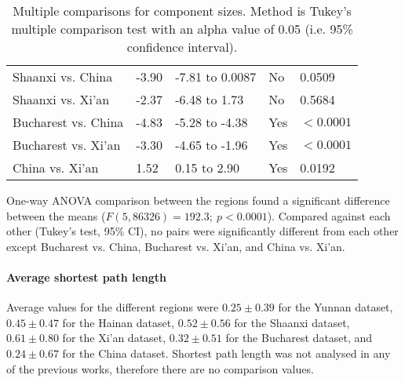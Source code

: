 \begin{table}[h]
\begin{mdframed}
\begin{tabular*}{\linewidth}{l|llll}
			Shaanxi vs. China & -3.90 & -7.81 to 0.0087 & No & 0.0509\\
			Shaanxi vs. Xi'an & -2.37 & -6.48 to 1.73 & No & 0.5684\\
			Bucharest vs. China & -4.83 & -5.28 to -4.38 & Yes & $<0.0001$\\
			Bucharest vs. Xi'an & -3.30 & -4.65 to -1.96 & Yes & $<0.0001$\\
			China vs. Xi'an & 1.52 & 0.15 to 2.90 & Yes & 0.0192\\
			\hline
		\end{tabular*}
		\caption{Multiple comparisons for component sizes. Method is Tukey's multiple comparison test with an alpha value of 0.05 (i.e. 95\% confidence interval).}
		\label{tab:component_size_tukey}
	\end{mdframed}
\end{table}

One-way ANOVA comparison between the regions found a significant difference between the means ($F(5,86326) = 192.3; \: p<0.0001$). Compared against each other (Tukey's test, 95\% CI), no pairs were significantly different from each other except Bucharest vs. China, Bucharest vs. Xi'an, and China vs. Xi'an.

\paragraph{Average shortest path length} Average values for the different regions were $0.25\pm0.39$ for the Yunnan dataset, $0.45\pm0.47$ for the Hainan dataset, $0.52\pm0.56$ for the Shaanxi dataset, $0.61\pm0.80$ for the Xi'an dataset, $0.32\pm0.51$ for the Bucharest dataset, and $0.24\pm0.67$ for the China dataset. Shortest path length was not analysed in any of the previous works, therefore there are no comparison values.

